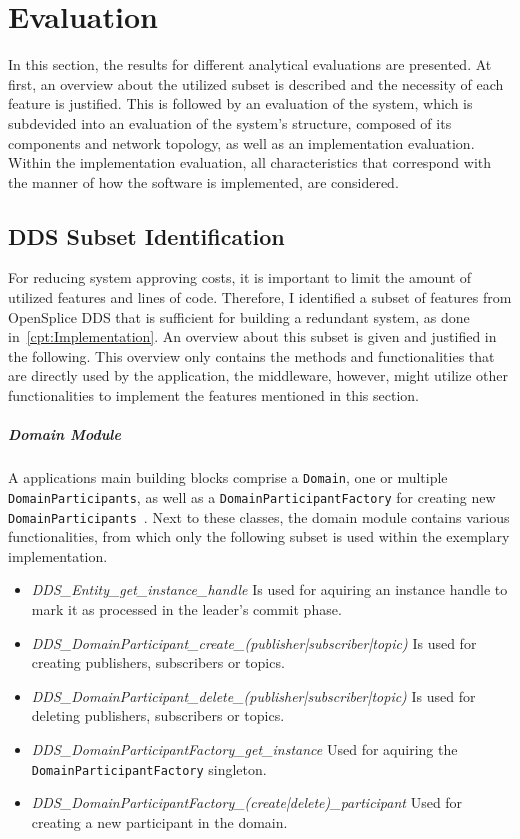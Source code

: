 \chapter{Evaluation}
\label{cpt:evaluation}
In this section, the results for different analytical evaluations are presented.
At first, an overview about the utilized  subset is described and the necessity of each feature is justified.
This is followed by an evaluation of the system, which is subdevided into an evaluation of the system's structure, composed of its components and network topology, as well as an implementation evaluation.
Within the implementation evaluation, all characteristics that correspond with the manner of how the software is implemented, are considered.

\section{DDS Subset Identification}

For reducing system approving costs, it is important to limit the amount of utilized features and lines of code.
Therefore, I identified a subset of  features from OpenSplice DDS that is sufficient for building a redundant system, as done in~\autoref{cpt:Implementation}.
An overview about this subset is given and justified in the following.
This overview only contains the methods and functionalities that are directly used by the application, the middleware, however, might utilize other functionalities to implement the features mentioned in this section.

\paragraph{Domain Module}
A  applications main building blocks comprise a \texttt{Domain}, one or multiple \texttt{DomainParticipants}, as well as a \texttt{DomainParticipantFactory} for creating new \texttt{DomainParticipants}~\cite{omgDDSspec}.
Next to these classes, the domain module contains various functionalities, from which only the following subset is used within the exemplary implementation.

\begin{itemize}
\item \textit{DDS\_Entity\_get\_instance\_handle} Is used for aquiring an instance handle to mark it as processed in the leader's commit phase.
\item \textit{DDS\_DomainParticipant\_create\_(publisher|subscriber|topic)} Is used for creating  publishers, subscribers or topics.
\item \textit{DDS\_DomainParticipant\_delete\_(publisher|subscriber|topic)} Is used for deleting  publishers, subscribers or topics.
\item \textit{DDS\_DomainParticipantFactory\_get\_instance} Used for aquiring the \texttt{DomainParticipantFactory} singleton.
\item \textit{DDS\_DomainParticipantFactory\_(create|delete)\_participant} Used for creating a new participant in the  domain.
\end{itemize}

